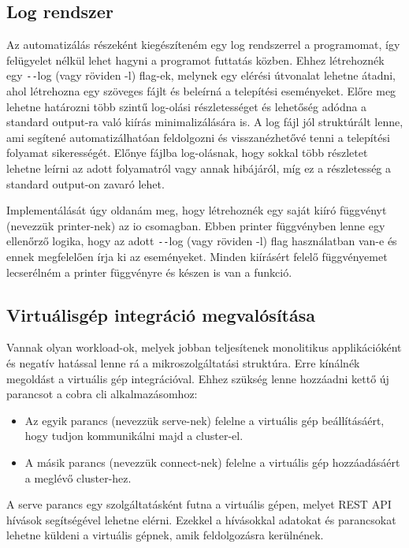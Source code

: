 \subsection{Log rendszer}
Az automatizálás részeként kiegészíteném egy log rendszerrel a programomat, így felügyelet nélkül lehet hagyni a programot futtatás közben.
Ehhez létrehoznék egy \texttt{-{}-}log (vagy röviden -l) flag-ek, melynek egy elérési útvonalat lehetne átadni, ahol létrehozna egy szöveges fájlt és beleírná a telepítési eseményeket. Előre meg lehetne határozni több szintű log-olási részletességet és lehetőség adódna a standard output-ra való kiírás minimalizálására is. A log fájl jól struktúrált lenne, ami segítené automatizálhatóan feldolgozni és visszanézhetővé tenni a telepítési folyamat sikerességét.
Előnye fájlba log-olásnak, hogy sokkal több részletet lehetne leírni az adott folyamatról vagy annak hibájáról, míg ez a részletesség a standard output-on zavaró lehet.

Implementálását úgy oldanám meg, hogy létrehoznék egy saját kiíró függvényt (nevezzük printer-nek) az io csomagban.
Ebben printer függvényben lenne egy ellenőrző logika, hogy az adott \texttt{-{}-}log (vagy röviden -l) flag használatban van-e és ennek megfelelően írja ki az eseményeket. Minden kiírásért felelő függvényemet lecserélném a printer függvényre és készen is van a funkció. 

\subsection{Virtuálisgép integráció megvalósítása}
Vannak olyan workload-ok, melyek jobban teljesítenek monolitikus applikációként és negatív hatással lenne rá a mikroszolgáltatási struktúra.
Erre kínálnék megoldást a virtuális gép integrációval.
Ehhez szükség lenne hozzáadni kettő új parancsot a cobra cli alkalmazásomhoz:
\begin{itemize}
  \item Az egyik parancs (nevezzük serve-nek) felelne a virtuális gép beállításáért, hogy tudjon kommunikálni majd a cluster-el.
  \item A másik parancs (nevezzük connect-nek) felelne a virtuális gép hozzáadásáért a meglévő cluster-hez.
\end{itemize}

A serve parancs egy szolgáltatásként futna a virtuális gépen, melyet REST API hívások segítségével lehetne elérni.
Ezekkel a hívásokkal adatokat és parancsokat lehetne küldeni a virtuális gépnek, amik feldolgozásra kerülnének.

